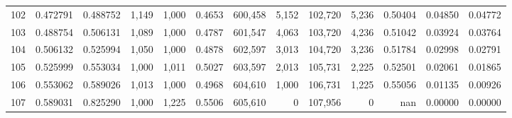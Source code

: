 \begin{tabular}{rrrrrrrrrrrrr}
102 &  0.472791 &  0.488752 &   1,149 &  1,000 &                                     0.4653 &  600,458 &    5,152 &  102,720 &    5,236 &  0.50404 &  0.04850 &  0.04772 \\
103 &  0.488754 &  0.506131 &   1,089 &  1,000 &                                     0.4787 &  601,547 &    4,063 &  103,720 &    4,236 &  0.51042 &  0.03924 &  0.03764 \\
104 &  0.506132 &  0.525994 &   1,050 &  1,000 &                                     0.4878 &  602,597 &    3,013 &  104,720 &    3,236 &  0.51784 &  0.02998 &  0.02791 \\
105 &  0.525999 &  0.553034 &   1,000 &  1,011 &                                     0.5027 &  603,597 &    2,013 &  105,731 &    2,225 &  0.52501 &  0.02061 &  0.01865 \\
106 &  0.553062 &  0.589026 &   1,013 &  1,000 &                                     0.4968 &  604,610 &    1,000 &  106,731 &    1,225 &  0.55056 &  0.01135 &  0.00926 \\
107 &  0.589031 &  0.825290 &   1,000 &  1,225 &                                     0.5506 &  605,610 &        0 &  107,956 &        0 &      nan &  0.00000 &  0.00000 \\
\bottomrule
\end{tabular}
